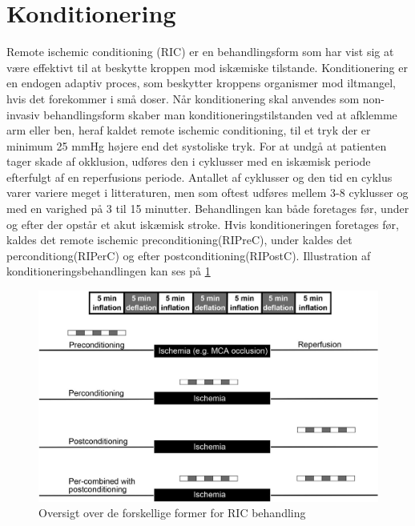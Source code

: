 \section{Konditionering}
Remote ischemic conditioning (RIC) er en behandlingsform som har vist sig at være effektivt til at beskytte kroppen mod iskæmiske tilstande. Konditionering er en endogen adaptiv proces, som beskytter kroppens organismer mod iltmangel, hvis det forekommer i små doser. Når konditionering skal anvendes som non-invasiv behandlingsform skaber man konditioneringstilstanden ved at afklemme arm eller ben, heraf kaldet remote ischemic conditioning, til et tryk der er minimum 25 mmHg højere end det systoliske tryk. For at undgå at patienten tager skade af okklusion, udføres den i cyklusser med en iskæmisk periode efterfulgt af en reperfusions periode. Antallet af cyklusser og den tid en cyklus varer variere meget i litteraturen, men som oftest udføres mellem 3-8 cyklusser og med en varighed på 3 til 15 minutter. 
Behandlingen kan både foretages før, under og efter der opstår et akut iskæmisk stroke. Hvis konditioneringen foretages før, kaldes det remote ischemic preconditioning(RIPreC), under kaldes det perconditiong(RIPerC) og efter postconditioning(RIPostC). Illustration af konditioneringsbehandlingen kan ses på \ref{fig:cycles}

\begin{figure}[H]
	\includegraphics[width = \textwidth]{billeder/PrePerPostKonditionering.png}
	\caption{Oversigt over de forskellige former for RIC behandling}\label{fig:cycles}
\end{figure}

